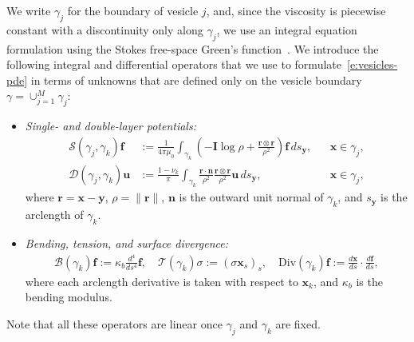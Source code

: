 \documentclass[3p,times,procedia]{elsarticle}
\newcommand{\ff}{{\mathbf{f}}}
\newcommand{\nn}{{\mathbf{n}}}
\newcommand{\rr}{{\mathbf{r}}}
\newcommand{\uu}{{\mathbf{u}}}
\newcommand{\xx}{{\mathbf{x}}}
\newcommand{\yy}{{\mathbf{y}}}
\newcommand{\BB}{{\mathcal{B}}}
\newcommand{\DD}{{\mathcal{D}}}
\newcommand{\Div}{{\mathrm{Div}}}
\renewcommand{\SS}{{\mathcal{S}}}
\newcommand{\TT}{{\mathcal{T}}}
\begin{document}
We write $\gamma_{j}$ for the boundary of vesicle $j$, and, since the
viscosity is piecewise constant with a discontinuity only along
$\gamma_{j}$, we use an integral equation formulation using the Stokes
free-space Green's function~\cite{rah:vee:bir2010}.  We introduce the
following integral and differential operators that we use to
formulate~\eqref{e:vesicles-pde} in terms of unknowns that are defined
only on the vesicle boundary $\gamma = \cup_{j=1}^{M} \gamma_{j}$:
\begin{itemize}[]
  \item{\em Single- and double-layer potentials:} 
  \begin{align*} 
    \SS(\gamma_{j},\gamma_{k}) \ff &:= \frac{1}{4\pi\mu_{0}}\int_{\gamma_{k}}\left(
      -\boldsymbol{I} \log \rho
    + \frac{\rr \otimes \rr}{\rho^{2}} \right)\ff\, ds_{\yy},
    && \xx \in \gamma_{j}, \\
    \DD(\gamma_{j},\gamma_{k}) \uu &:= \frac{1-\nu_{k}}{\pi}\int_{\gamma_{k}}
      \frac{\rr \cdot \nn}{\rho^{2}}\frac{\rr \otimes \rr}{\rho^{2}}\uu\,
    ds_{\yy}, && \xx \in \gamma_{j},
  \end{align*}
  where $\rr = \xx - \yy$, $\rho = \|\rr\|$, $\nn$ is the outward unit
  normal of $\gamma_{k}$, and $s_{\yy}$ is the arclength of
  $\gamma_{k}$. 
  \item{\em Bending, tension, and surface divergence:} 
  \begin{align*}
    \BB(\gamma_{k}) \ff := \kappa_{b}\frac{d^{4}}{ds^4} \ff, \quad
    \TT(\gamma_{k}) \sigma := (\sigma \xx_{s})_{s}, \quad
    \Div(\gamma_{k}) \ff := \frac{d\xx}{ds} \cdot \frac{d\ff}{ds},
  \end{align*}
  where each arclength derivative is taken with respect to $\xx_{k}$,
  and $\kappa_{b}$ is the bending modulus.
\end{itemize}
Note that all these operators are linear once $\gamma_{j}$ and
$\gamma_{k}$ are fixed.


\end{document}
